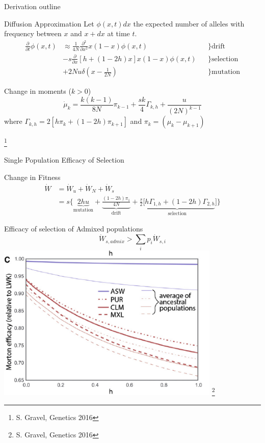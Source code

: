 \documentclass[10pt]{beamer}
\newcommand{\del}[1]{\ensuremath{\frac{\partial}{\partial #1}}}
\newcommand{\dell}[1]{\ensuremath{\frac{\partial^2}{\partial #1^2}}}
\begin{document}
\begin{frame}{Derivation outline}
  \begin{alertblock}{Diffusion Approximation}
    Let $\phi(x,t)dx$ the expected number of alleles with frequency between $x$
    and $x + dx$ at time $t$.
    \begin{align}
      \del t \phi(x,t) & \approx \frac{1}{4N} \dell x x(1-x) \phi(x,t) 
      & &\bigg\} \mathrm{drift}
      \nonumber \\ 
      &- s \del x [h + ( 1 - 2h)x]x(1-x) \phi(x,t) 
      & &\bigg\} \mathrm{selection}
      \nonumber \\
      &+ 2Nu\delta\left(x - \frac{1}{2N}\right)
      & &\bigg\} \mathrm{mutation}
    \end{align}
  \end{alertblock}
  \begin{block}{Change in moments ($ k > 0$)}
    \[
      \dot \mu_k = \frac{k(k-1)}{8N} \pi_{k-1} + 
        \frac{sk}{4} \Gamma_{k,h} +
        \frac{u}{(2N)^{k-1}}
    \]
    where $\Gamma_{k,h} = 2[h\pi_k + (1 - 2h) \pi_{k+1}]$ and $\pi_k=(\mu_k - \mu_{k + 1})$
  \end{block}
  \let\thefootnote\relax\footnote{S. Gravel, Genetics 2016}
\end{frame}

\begin{frame}{Single Population Efficacy of Selection}
  \begin{block}{Change in Fitness}
  \begin{align}
    \dot W &= \dot W_u + \dot W_N + \dot W_s
    \nonumber \\
    &= s \big\{
    \underbrace{2hu}_\text{mutation} + 
    \underbrace{\frac{(1 - 2h)\pi_1}{4N}}_\text{drift} + 
    \underbrace{\frac{s}{2}[h\Gamma_{1,h}+(1-2h)\Gamma_{2,h}}_\text{selection}]
      \big\}
  \end{align}
  \end{block}
\end{frame}

\begin{frame}{\normalsize Efficacy of selection of Admixed populations} 
  \vfill
  \centering
  \[
    \dot W_{s,admix} > \sum_i p_i \dot W_{s,i}
  \]
  \includegraphics[width=0.8\textwidth]{./Figures/Gravel_efsel_admix.png}
  \let\thefootnote\relax\footnote{S. Gravel, Genetics 2016}
\end{frame}
\end{document}
